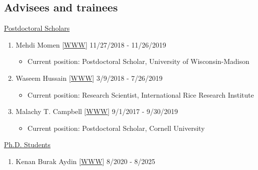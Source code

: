 \documentclass[margin,line,10pt]{res}
\begin{document}
\begin{resume}
\section{\sc Advisees and trainees}

\begin{flushleft}
\hspace{0.2cm} \underline{Postdoctoral Scholars}
\end{flushleft}
\begin{enumerate}
  
\item [3.] Mehdi Momen [\textcolor{blue}{\href{https://mehdimomen.github.io/}{WWW}}]  \hfill 11/27/2018 - 11/26/2019
  \begin{itemize} 
  \item Current position: Postdoctoral Scholar, University of Wisconsin-Madison 
  \end{itemize}
  
  \vspace{0.3cm}
  
\item [2.] Waseem Hussain  [\textcolor{blue}{\href{https://whussain2.github.io/}{WWW}}]  \hfill 3/9/2018 - 7/26/2019
  \begin{itemize} 
  \item Current position: Research Scientist, International Rice Research Institute
  \end{itemize}
   
  \vspace{0.3cm}
  
\item [1.] Malachy T. Campbell  [\textcolor{blue}{\href{https://malachycampbell.github.io/}{WWW}}]  \hfill  9/1/2017 - 9/30/2019
  \begin{itemize} 
  \item Current position: Postdoctoral Scholar, Cornell University 
  \end{itemize}
\end{enumerate}



\begin{flushleft}
\hspace{0.2cm} \underline{Ph.D. Students}
\end{flushleft}
\begin{enumerate}


  \item [6.] Kenan Burak Aydin [\textcolor{blue}{\href{}{WWW}}]  \hfill  8/2020 - 8/2025


\end{enumerate}
\end{resume}
\end{document}
